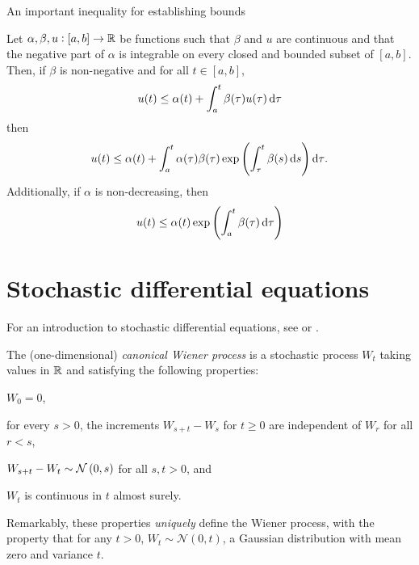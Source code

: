 An important inequality for establishing bounds 

\begin{theorem}\label{thm:gronwall}
	Let \(\alpha, \beta, u: [a,b] \to \mathbb{R}\) be functions such that \(\beta\) and \(u\) are continuous and that the negative part of \(\alpha\) is integrable on every closed and bounded subset of \([a,b]\).
	Then, if \(\beta\) is non-negative and for all \(t \in [a,b]\),
	\[
		u(t) \leq \alpha(t) + \int_a^t{\beta(\tau)u(\tau)\dif\tau}
	\]
	then
	\[
		u(t) \leq \alpha(t) + \int_a^t{\alpha(\tau)\beta(\tau)\exp\left(\int_\tau^{t}{\beta(s)\dif s}\right)\dif\tau}.
	\]
	Additionally, if \(\alpha\) is non-decreasing, then
	\[
		u(t) \leq \alpha(t) \exp\left(\int_a^t{\beta(\tau)\dif\tau}\right)
	\]
\end{theorem}









\section{Stochastic differential equations}

For an introduction to stochastic differential equations, see \citet{Oksendal_2003_StochasticDifferentialEquations} or \citet{KallianpurSundar_2014_StochasticAnalysisDiffusion}.


\begin{definition}\label{def:wiener}
	The (one-dimensional) \emph{canonical Wiener process} is a stochastic process \(W_t\) taking values in \(\mathbb{R}\) and satisfying the following properties:
	\begin{romanate}
	\item \(W_0 = 0\), 
	\item for every \(s > 0\), the increments \(W_{s + t} - W_{s}\) for \(t \geq 0\) are independent of \(W_r\) for all \(r < s\),
	\item \(W_{s + t} - W_t \sim\mathcal{N}\left(0, s\right)\) for all \(s,t > 0\), and 
	\item \(W_t\) is continuous in \(t\) almost surely.
	\end{romanate}
\end{definition}
Remarkably, these properties \emph{uniquely} define the Wiener process, with the property that for any \(t > 0\), \(W_t \sim \mathcal{N}\left(0, t\right)\), a Gaussian distribution with mean zero and variance \(t\).




